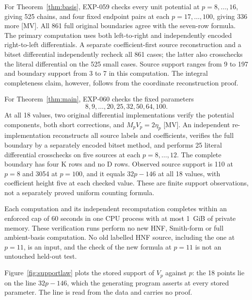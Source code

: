 \documentclass[11pt]{article}
\theoremstyle{definition}
\theoremstyle{remark}
\begin{document}
For Theorem~\ref{thm:basis}, EXP-059 checks every unit potential at
$p=8,\ldots,16$, giving 525 chains, and four fixed endpoint pairs
at each $p=17,\ldots,100$, giving 336 more [MV]. All 861 full original
boundaries agree with the seven-row formula. The primary computation uses
both left-to-right and independently encoded right-to-left differentials.
A separate coefficient-first source reconstruction and a bitset differential
independently recheck all 861 cases; the latter also crosschecks the literal
differential on the 525 small cases. Source support ranges from 9 to 197 and
boundary support from 3 to 7 in this computation. The integral completeness
claim, however, follows from the coordinate reconstruction proof.

For Theorem~\ref{thm:main}, EXP-060 checks the fixed parameters
\[
 8,9,\ldots,20,25,32,50,64,100.
\]
At all 18 values, two original differential implementations verify the
potential components, both short corrections, and $M_pV_p=2\eta_p$ [MV].
An independent re-implementation reconstructs all source labels and coefficients,
verifies the full boundary by a separately encoded bitset method, and
performs 25 literal differential crosschecks on five sources at each
$p=8,\ldots,12$. The complete boundary has four K rows and no D rows.
Observed source support is 110 at $p=8$ and 3054 at $p=100$, and it equals
$32p-146$ at all 18 values, with
coefficient height five at each checked value. These are finite support
observations, not a separately proved uniform counting formula.

Each computation and its independent recomputation completes within an enforced cap of 60
seconds in one CPU process with at most 1~GiB of private memory. These
verification runs perform no new HNF, Smith-form or full ambient-basis
computation. No old labelled HNF source, including the one at $p=11$, is
an input, and the check of the new formula at $p=11$ is not an untouched
held-out test.

Figure~\ref{fig:supportlaw} plots the stored support of $V_p$ against $p$: the 18 points lie on the line $32p-146$, which the generating program asserts at every stored parameter. The line is read from the data and carries no proof.
\end{document}
